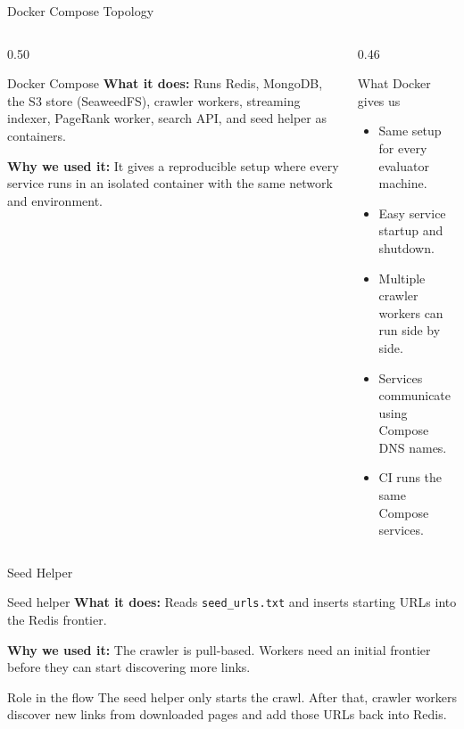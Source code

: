 \documentclass[aspectratio=169,11pt]{beamer}
\newcommand{\component}[3]{%
  \begin{block}{#1}
    \textbf{What it does:} #2

    \vspace{0.35em}
    \textbf{Why we used it:} #3
  \end{block}
}
\begin{document}
\begin{frame}{Docker Compose Topology}
  \begin{columns}[T,totalwidth=\textwidth]
    \begin{column}{0.50\textwidth}
      \component{Docker Compose}
      {Runs Redis, MongoDB, the S3 store (SeaweedFS), crawler workers, streaming indexer, PageRank worker, search API, and seed helper as containers.}
      {It gives a reproducible setup where every service runs in an isolated container with the same network and environment.}
    \end{column}
    \begin{column}{0.46\textwidth}
      \begin{block}{What Docker gives us}
        \begin{itemize}
          \item Same setup for every evaluator machine.
          \item Easy service startup and shutdown.
          \item Multiple crawler workers can run side by side.
          \item Services communicate using Compose DNS names.
          \item CI runs the same Compose services.
        \end{itemize}
      \end{block}
    \end{column}
  \end{columns}
\end{frame}

\begin{frame}{Seed Helper}
  \component{Seed helper}
  {Reads \texttt{seed\_urls.txt} and inserts starting URLs into the Redis frontier.}
  {The crawler is pull-based. Workers need an initial frontier before they can start discovering more links.}

  \begin{block}{Role in the flow}
    The seed helper only starts the crawl. After that, crawler workers discover new links from downloaded pages and add those URLs back into Redis.
  \end{block}
\end{frame}
\end{document}
